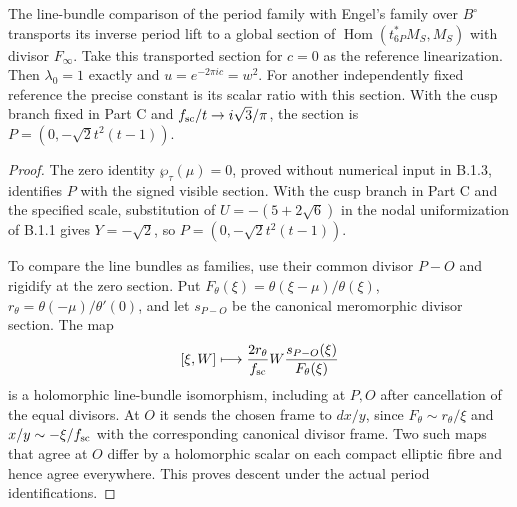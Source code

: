 \begin{proposition}\label{fam:src:B.1.4}\label{fam:st:B.1.4}
The line-bundle comparison of the period family with Engel's family over $B^\circ$ transports its inverse period lift to a global section of $\operatorname{Hom}(t_{6P}^*M_S,M_S)$ with divisor $F_\infty$. Take this transported section for $c=0$ as the reference linearization. Then $\lambda_0=1$ exactly and $u=e^{-2\pi ic}=w^2$. For another independently fixed reference the precise constant is its scalar ratio with this section. With the cusp branch fixed in Part C and $f_{\rm sc}/t\to i\sqrt3/\pi$, the section is $P=(0,-\sqrt2t^2(t-1))$.
\end{proposition}
\begin{proof}
The zero identity $\wp_\tau(\mu)=0$, proved without numerical input in B.1.3, identifies $P$ with the signed visible section. With the cusp branch in Part C and the specified scale, substitution of $U=-(5+2\sqrt6)$ in the nodal uniformization of B.1.1 gives $Y=-\sqrt2$, so $P=(0,-\sqrt2t^2(t-1))$.

To compare the line bundles as families, use their common divisor $P-O$ and rigidify at the zero section. Put $F_\theta(\xi)=\theta(\xi-\mu)/\theta(\xi)$, $r_\theta=\theta(-\mu)/\theta'(0)$, and let $s_{P-O}$ be the canonical meromorphic divisor section. The map
\[
 [\xi,W]\longmapsto\frac{2r_\theta}{f_{\rm sc}}
        W\frac{s_{P-O}(\xi)}{F_\theta(\xi)}
\]
is a holomorphic line-bundle isomorphism, including at $P,O$ after cancellation of the equal divisors. At $O$ it sends the chosen frame to $dx/y$, since $F_\theta\sim r_\theta/\xi$ and $x/y\sim-\xi/f_{\rm sc}$ with the corresponding canonical divisor frame. Two such maps that agree at $O$ differ by a holomorphic scalar on each compact elliptic fibre and hence agree everywhere. This proves descent under the actual period identifications.


\end{proof}
